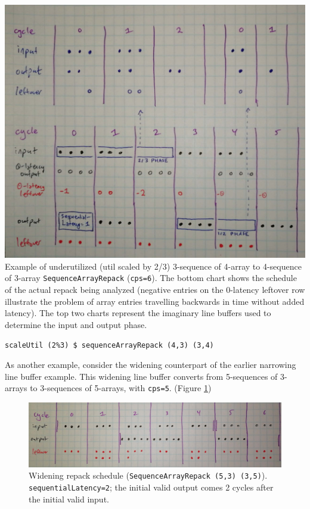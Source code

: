 \documentclass[12pt]{article}
\begin{document}
\begin{center}
\includegraphics[width=1.0\linewidth]{Figures/underutil-repack.jpg}
Example of underutilized (util scaled by 2/3) 3-sequence of 4-array to 4-sequence of
3-array \texttt{SequenceArrayRepack} (\texttt{cps=6}). The bottom
chart shows the schedule of the actual repack being analyzed (negative
entries on the 0-latency leftover row illustrate the problem of array
entries travelling backwards in time without added latency). The top
two charts represent the imaginary line buffers used to determine the
input and output phase.

\texttt{scaleUtil (2\%3) \$ sequenceArrayRepack (4,3) (3,4)}
\end{center}

\newpage
As another example, consider the widening counterpart of the earlier
narrowing line buffer example. This widening line buffer converts from
5-sequences of 3-arrays to 3-sequences of 5-arrays, with
\texttt{cps=5}. (Figure \ref{widening.jpg})

\begin{figure}[bth]
\includegraphics[width=1.0\linewidth]{Figures/widening.jpg}
\caption{Widening repack schedule (\texttt{SequenceArrayRepack (5,3) (3,5)}).
\texttt{sequentialLatency=2}; the initial valid output comes 2 cycles
after the initial valid input.}
\label{widening.jpg}
\end{figure}
\end{document}
